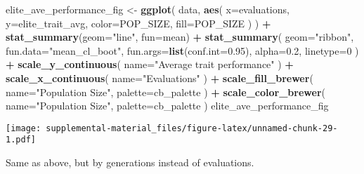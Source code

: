 \documentclass[]{book}
\newenvironment{Shaded}{\begin{snugshade}}{\end{snugshade}}
\newcommand{\DataTypeTok}[1]{\textcolor[rgb]{0.13,0.29,0.53}{#1}}
\newcommand{\DecValTok}[1]{\textcolor[rgb]{0.00,0.00,0.81}{#1}}
\newcommand{\FloatTok}[1]{\textcolor[rgb]{0.00,0.00,0.81}{#1}}
\newcommand{\KeywordTok}[1]{\textcolor[rgb]{0.13,0.29,0.53}{\textbf{#1}}}
\newcommand{\NormalTok}[1]{#1}
\newcommand{\OperatorTok}[1]{\textcolor[rgb]{0.81,0.36,0.00}{\textbf{#1}}}
\newcommand{\StringTok}[1]{\textcolor[rgb]{0.31,0.60,0.02}{#1}}
\begin{document}
\begin{Shaded}
\begin{Highlighting}[]
\NormalTok{elite_ave_performance_fig <-}
\StringTok{  }\KeywordTok{ggplot}\NormalTok{(}
\NormalTok{    data,}
    \KeywordTok{aes}\NormalTok{(}
      \DataTypeTok{x=}\NormalTok{evaluations,}
      \DataTypeTok{y=}\NormalTok{elite_trait_avg,}
      \DataTypeTok{color=}\NormalTok{POP_SIZE,}
      \DataTypeTok{fill=}\NormalTok{POP_SIZE}
\NormalTok{    )}
\NormalTok{  ) }\OperatorTok{+}
\StringTok{  }\KeywordTok{stat_summary}\NormalTok{(}\DataTypeTok{geom=}\StringTok{"line"}\NormalTok{, }\DataTypeTok{fun=}\NormalTok{mean) }\OperatorTok{+}
\StringTok{  }\KeywordTok{stat_summary}\NormalTok{(}
    \DataTypeTok{geom=}\StringTok{"ribbon"}\NormalTok{,}
    \DataTypeTok{fun.data=}\StringTok{"mean_cl_boot"}\NormalTok{,}
    \DataTypeTok{fun.args=}\KeywordTok{list}\NormalTok{(}\DataTypeTok{conf.int=}\FloatTok{0.95}\NormalTok{),}
    \DataTypeTok{alpha=}\FloatTok{0.2}\NormalTok{,}
    \DataTypeTok{linetype=}\DecValTok{0}
\NormalTok{  ) }\OperatorTok{+}
\StringTok{  }\KeywordTok{scale_y_continuous}\NormalTok{(}
    \DataTypeTok{name=}\StringTok{"Average trait performance"}
\NormalTok{  ) }\OperatorTok{+}
\StringTok{  }\KeywordTok{scale_x_continuous}\NormalTok{(}
    \DataTypeTok{name=}\StringTok{"Evaluations"}
\NormalTok{  ) }\OperatorTok{+}
\StringTok{  }\KeywordTok{scale_fill_brewer}\NormalTok{(}
    \DataTypeTok{name=}\StringTok{"Population Size"}\NormalTok{,}
    \DataTypeTok{palette=}\NormalTok{cb_palette}
\NormalTok{  ) }\OperatorTok{+}
\StringTok{  }\KeywordTok{scale_color_brewer}\NormalTok{(}
    \DataTypeTok{name=}\StringTok{"Population Size"}\NormalTok{,}
    \DataTypeTok{palette=}\NormalTok{cb_palette}
\NormalTok{  )}
\NormalTok{elite_ave_performance_fig}
\end{Highlighting}
\end{Shaded}

\texttt{[image: supplemental-material\_files/figure-latex/unnamed-chunk-29-1.pdf]}

Same as above, but by generations instead of evaluations.
\end{document}
